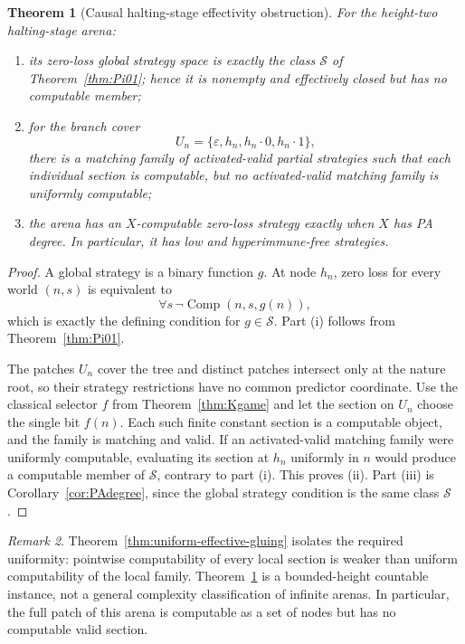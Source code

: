 \documentclass[11pt]{article}
\theoremstyle{plain}
\newtheorem{theorem}{Theorem}[section]
\theoremstyle{definition}
\theoremstyle{remark}
\newtheorem{remark}[theorem]{Remark}
\begin{document}
\begin{theorem}[Causal halting-stage effectivity obstruction]
\label{thm:K-arena}
For the height-two halting-stage arena:
\begin{enumerate}[label=(\roman*)]
\item its zero-loss global strategy space is exactly the class $\mathcal S$ of
Theorem~\ref{thm:Pi01}; hence it is nonempty and effectively closed but has no
computable member;
\item for the branch cover
\[
U_n=\{\varepsilon,h_n,h_n\!\cdot0,h_n\!\cdot1\},
\]
there is a matching family of activated-valid partial strategies such that each
individual section is computable, but no activated-valid matching family is
uniformly computable;
\item the arena has an $X$-computable zero-loss strategy exactly when $X$ has
PA degree. In particular, it has low and hyperimmune-free strategies.
\end{enumerate}
\end{theorem}

\begin{proof}
A global strategy is a binary function $g$. At node $h_n$, zero loss for every
world $(n,s)$ is equivalent to
\[
\forall s\,\neg\operatorname{Comp}(n,s,g(n)),
\]
which is exactly the defining condition for $g\in\mathcal S$. Part (i) follows
from Theorem~\ref{thm:Pi01}.

The patches $U_n$ cover the tree and distinct patches intersect only at the
nature root, so their strategy restrictions have no common predictor coordinate.
Use the classical selector $f$ from Theorem~\ref{thm:Kgame} and let the section
on $U_n$ choose the single bit $f(n)$. Each such finite constant section is a
computable object, and the family is matching and valid. If an activated-valid
matching family were uniformly computable, evaluating its section at $h_n$
uniformly in $n$ would produce a computable member of $\mathcal S$, contrary to
part (i). This proves (ii). Part (iii) is Corollary~\ref{cor:PAdegree}, since the
global strategy condition is the same class $\mathcal S$.
\end{proof}

\begin{remark}
Theorem~\ref{thm:uniform-effective-gluing} isolates the required uniformity:
pointwise computability of every local section is weaker than uniform
computability of the local family. Theorem~\ref{thm:K-arena} is a bounded-height countable instance, not a
general complexity classification of infinite arenas. In particular, the full
patch of this arena is computable as a set of nodes but has no computable valid
section.
\end{remark}
\end{document}
